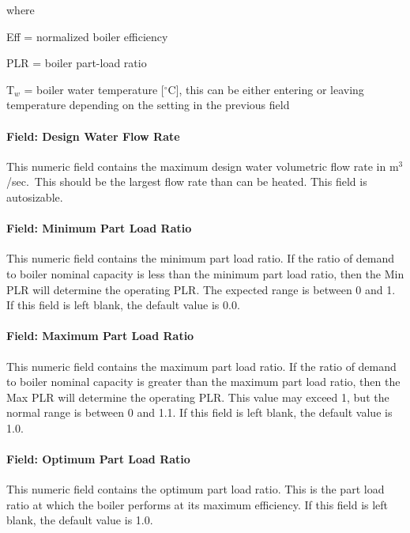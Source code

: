 where

Eff = normalized boiler efficiency

PLR = boiler part-load ratio

T\(_{w}\) = boiler water temperature {[}$^\circ$C{]}, this can be either entering or leaving temperature depending on the setting in the previous field

\paragraph{Field: Design Water Flow Rate}\label{field-design-water-flow-rate-001}

This numeric field contains the maximum design water volumetric flow rate in m\(^{3}\)/sec.~This should be the largest flow rate than can be heated. This field is autosizable.

\paragraph{Field: Minimum Part Load Ratio}\label{field-minimum-part-load-ratio-9}

This numeric field contains the minimum part load ratio. If the ratio of demand to boiler nominal capacity is less than the minimum part load ratio, then the Min PLR will determine the operating PLR. The expected range is between 0 and 1. If this field is left blank, the default value is 0.0.

\paragraph{Field: Maximum Part Load Ratio}\label{field-maximum-part-load-ratio-9}

This numeric field contains the maximum part load ratio. If the ratio of demand to boiler nominal capacity is greater than the maximum part load ratio, then the Max PLR will determine the operating PLR. This value may exceed 1, but the normal range is between 0 and 1.1. If this field is left blank, the default value is 1.0.

\paragraph{Field: Optimum Part Load Ratio}\label{field-optimum-part-load-ratio-9}

This numeric field contains the optimum part load ratio. This is the part load ratio at which the boiler performs at its maximum efficiency. If this field is left blank, the default value is 1.0.

